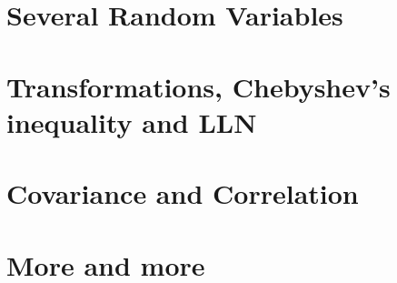 \documentclass[12pt,a4paper]{article}
\newcommand{\1}{\mathbbm{1}}
\begin{document}
\section{Several Random Variables}


\section{Transformations, Chebyshev's inequality and LLN}



\section{Covariance and Correlation}


\section{More and more}


%
%
%
\end{document}
